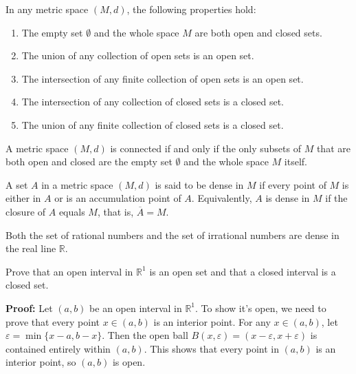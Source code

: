 \begin{theorem}
In any metric space $(M,d)$, the following properties hold:
\begin{enumerate}
\item The empty set $\emptyset$ and the whole space $M$ are both open and closed sets.
\item The union of any collection of open sets is an open set.
\item The intersection of any finite collection of open sets is an open set.
\item The intersection of any collection of closed sets is a closed set.
\item The union of any finite collection of closed sets is a closed set.
\end{enumerate}
\end{theorem}

\begin{theorem}
A metric space $(M,d)$ is connected if and only if the only subsets of $M$ that are both open and closed are the empty set $\emptyset$ and the whole space $M$ itself.
\end{theorem}

\begin{definition}
A set $A$ in a metric space $(M,d)$ is said to be dense in $M$ if every point of $M$ is either in $A$ or is an accumulation point of $A$. Equivalently, $A$ is dense in $M$ if the closure of $A$ equals $M$, that is, $\overline{A} = M$.
\end{definition}

\begin{theorem}
Both the set of rational numbers and the set of irrational numbers are dense in the real line $\mathbb{R}$.
\end{theorem}

\begin{problembox}
Prove that an open interval in $\mathbb{R}^1$ is an open set and that a closed interval is a closed set.
\end{problembox}

\textbf{Proof:} Let $(a,b)$ be an open interval in $\mathbb{R}^1$. To show it's open, we need to prove that every point $x \in (a,b)$ is an interior point. For any $x \in (a,b)$, let $\varepsilon = \min\{x-a, b-x\}$. Then the open ball $B(x,\varepsilon) = (x-\varepsilon, x+\varepsilon)$ is contained entirely within $(a,b)$. This shows that every point in $(a,b)$ is an interior point, so $(a,b)$ is open.

